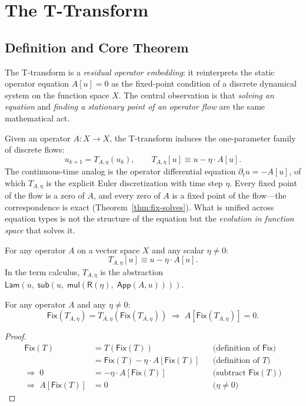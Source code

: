 \documentclass{lmcs}
\theoremstyle{plain}
\theoremstyle{definition}
\newcommand{\fix}{\mathsf{Fix}}
\begin{document}
\section{The T-Transform}\label{sec:ttransform}

\subsection{Definition and Core Theorem}

The T-transform is a \emph{residual operator embedding}: it reinterprets the
static operator equation $A[u] = 0$ as the fixed-point condition of a discrete
dynamical system on the function space $X$. The central observation is that
\emph{solving an equation} and \emph{finding a stationary point of an
operator flow} are the same mathematical act.

Given an operator $A : X \to X$, the T-transform induces the one-parameter
family of discrete flows:
\[
u_{k+1} = T_{A,\eta}(u_k), \qquad
T_{A,\eta}[u] \equiv u - \eta \cdot A[u].
\]
The continuous-time analog is the operator differential equation
$\partial_t u = -A[u]$, of which $T_{A,\eta}$ is the explicit Euler
discretization with time step $\eta$. Every fixed point of the flow is a zero
of $A$, and every zero of $A$ is a fixed point of the flow---the correspondence
is exact (Theorem~\ref{thm:fix-solves}). What is unified across equation types
is not the structure of the equation but the \emph{evolution in function space}
that solves it.

\begin{defi}[T-transform]
For any operator $A$ on a vector space $X$ and any scalar $\eta \neq 0$:
\[
T_{A,\eta}[u] \equiv u - \eta \cdot A[u].
\]
In the term calculus, $T_{A,\eta}$ is the abstraction
$\mathsf{Lam}(u,\; \mathsf{sub}(u,\; \mathsf{mul}(\mathsf{R}(\eta),\;
\mathsf{App}(A, u))))$.
\end{defi}

\begin{thm}\label{thm:fix-solves}
For any operator $A$ and any $\eta \neq 0$:
\[
\fix(T_{A,\eta}) = T_{A,\eta}(\fix(T_{A,\eta}))
\;\Longrightarrow\;
A[\fix(T_{A,\eta})] = 0.
\]
\end{thm}

\begin{proof}
\begin{align*}
\fix(T) &= T(\fix(T))
  &&\text{(definition of $\fix$)} \\
        &= \fix(T) - \eta \cdot A[\fix(T)]
  &&\text{(definition of $T$)} \\
\Rightarrow\; 0 &= -\eta \cdot A[\fix(T)]
  &&\text{(subtract $\fix(T)$)} \\
\Rightarrow\; A[\fix(T)] &= 0
  &&\text{($\eta \neq 0$)}
\end{align*}
\end{proof}
\end{document}
